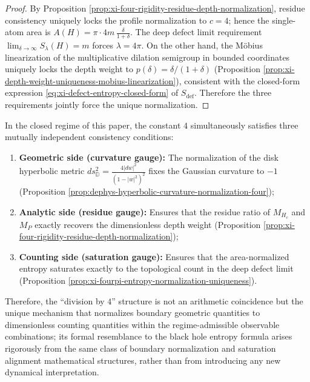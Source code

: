 \begin{proof}
By Proposition \ref{prop:xi-four-rigidity-residue-depth-normalization}, residue consistency uniquely locks the profile normalization to \(c=4\); hence the single-atom area is
\(
A(H)=\pi\cdot 4m\,\frac{\delta}{1+\delta}
\).
The deep defect limit requirement \(\lim_{\delta\to\infty}S_\lambda(H)=m\) forces \(\lambda=4\pi\).
On the other hand, the M\"obius linearization of the multiplicative dilation semigroup in bounded coordinates uniquely locks the depth weight to
\(
p(\delta)=\delta/(1+\delta)
\)
(Proposition \ref{prop:xi-depth-weight-uniqueness-mobius-linearization}), consistent with the closed-form expression \eqref{eq:xi-defect-entropy-closed-form} of \(S_{\mathrm{def}}\).
Therefore the three requirements jointly force the unique normalization. \qedhere
\end{proof}
\begin{remark}\label{rem:xi-four-triple-consistency-curvature-residue-saturation}
In the closed regime of this paper, the constant \(4\) simultaneously satisfies three mutually independent consistency conditions:
\begin{enumerate}
  \item \textbf{Geometric side (curvature gauge):} The normalization of the disk hyperbolic metric \(ds^2_{\mathbb D}=\frac{4|dw|^2}{(1-|w|^2)^2}\) fixes the Gaussian curvature to \(-1\) (Proposition \ref{prop:dephys-hyperbolic-curvature-normalization-four});
  \item \textbf{Analytic side (residue gauge):} Ensures that the residue ratio of \(M_{H_c}\) and \(M_P\) exactly recovers the dimensionless depth weight (Proposition \ref{prop:xi-four-rigidity-residue-depth-normalization});
  \item \textbf{Counting side (saturation gauge):} Ensures that the area-normalized entropy saturates exactly to the topological count in the deep defect limit (Proposition \ref{prop:xi-fourpi-entropy-normalization-uniqueness}).
\end{enumerate}
Therefore, the ``division by \(4\)'' structure is not an arithmetic coincidence but the unique mechanism that normalizes boundary geometric quantities to dimensionless counting quantities within the regime-admissible observable combinations; its formal resemblance to the black hole entropy formula arises rigorously from the same class of boundary normalization and saturation alignment mathematical structures, rather than from introducing any new dynamical interpretation.
\end{remark}





